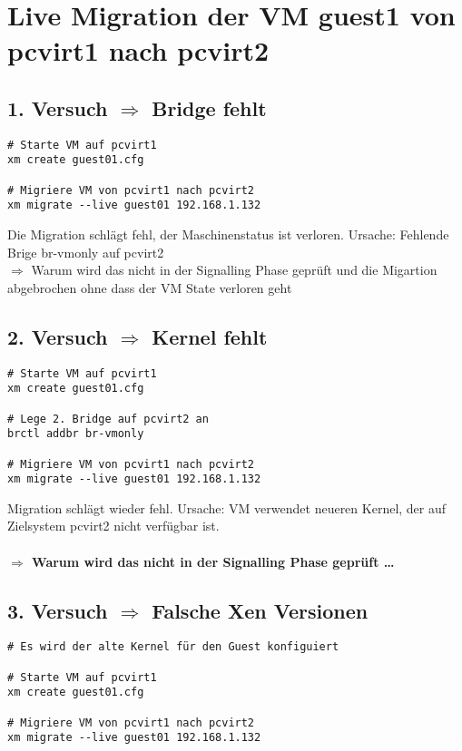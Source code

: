 \section{Live Migration der VM guest1 von pcvirt1 nach pcvirt2}

\subsection{1. Versuch $\Rightarrow$ Bridge fehlt}
\setupVerbatimOut
\begin{verbatim}
# Starte VM auf pcvirt1
xm create guest01.cfg

# Migriere VM von pcvirt1 nach pcvirt2
xm migrate --live guest01 192.168.1.132
\end{verbatim}

Die Migration schlägt fehl, der Maschinenstatus ist verloren. Ursache: Fehlende Brige br-vmonly auf pcvirt2
\\
$\Rightarrow$ Warum wird das nicht in der Signalling Phase geprüft und die Migartion abgebrochen ohne dass der VM State verloren geht

\subsection {2. Versuch $\Rightarrow$ Kernel fehlt}
\setupVerbatimOut
\begin{verbatim}
# Starte VM auf pcvirt1
xm create guest01.cfg

# Lege 2. Bridge auf pcvirt2 an
brctl addbr br-vmonly

# Migriere VM von pcvirt1 nach pcvirt2
xm migrate --live guest01 192.168.1.132
\end{verbatim}

Migration schlägt wieder fehl. Ursache: VM verwendet neueren Kernel, der auf Zielsystem pcvirt2 nicht verfügbar ist.
\\
\\
\large{\textbf{$\Rightarrow$ Warum wird das nicht in der Signalling Phase geprüft  \dots}}

\subsection {3. Versuch $\Rightarrow$ Falsche Xen Versionen}
\setupVerbatimOut
\begin{verbatim}
# Es wird der alte Kernel für den Guest konfiguiert

# Starte VM auf pcvirt1
xm create guest01.cfg

# Migriere VM von pcvirt1 nach pcvirt2
xm migrate --live guest01 192.168.1.132
\end{verbatim}


